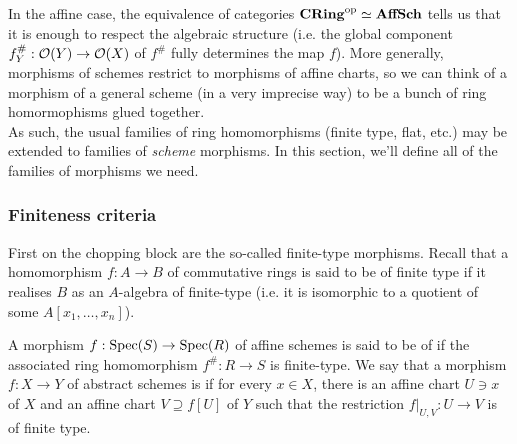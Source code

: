 In the affine case, the equivalence of categories $\mathbf{CRing}^{\text{op}} \simeq \mathbf{AffSch}$ tells us that it is enough to respect the algebraic structure (i.e. the global component $f^{\#}_Y : \mathcal{O}(Y) \to \mathcal{O}(X)$ of $f^{\#}$ fully determines the map $f$). More generally, morphisms of schemes restrict to morphisms of affine charts, so we can think of a morphism of a general scheme (in a very imprecise way) to be a bunch of ring homormophisms glued together.\\

As such, the usual families of ring homomorphisms (finite type, flat, etc.) may be extended to families of \emph{scheme} morphisms. In this section, we'll define all of the families of morphisms we need. 

\subsubsection{Finiteness criteria}
\label{subsubsec:2_4_1_finiteness}
First on the chopping block are the so-called finite-type morphisms. Recall that a homomorphism $f : A \to B$ of commutative rings is said to be of finite type if it realises $B$ as an $A$-algebra of finite-type (i.e. it is isomorphic to a quotient of some $A[x_1, \ldots, x_n]$).

\begin{defn}
	A morphism $f : \mathrm{Spec}(S) \to \mathrm{Spec}(R)$ of affine schemes is said to be of  if the associated ring homomorphism $f^{\#} : R \to S$ is finite-type. We say that a morphism $f : X \to Y$ of abstract schemes is  if for every $x \in X$, there is an affine chart $U \ni x$ of $X$ and an affine chart $V \supseteq f[U]$ of $Y$ such that the restriction $f|_{U,V} : U \to V$ is of finite type.
\end{defn}

